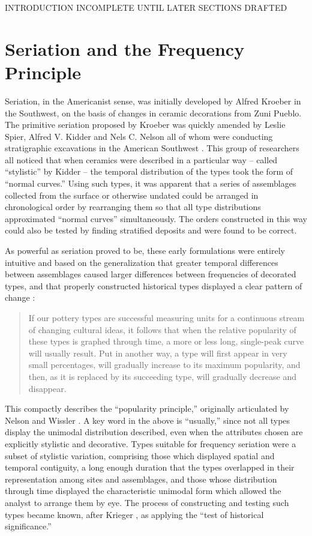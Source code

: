 \documentclass[graybox,natbib]{svmult}
\begin{document}
INTRODUCTION INCOMPLETE UNTIL LATER SECTIONS DRAFTED

\section{Seriation and the Frequency
Principle}\label{seriation-and-the-frequency-principle}

Seriation, in the Americanist sense, was initially developed by Alfred
Kroeber \citep{Kroeber1916} in the Southwest, on the basis of changes in
ceramic decorations from Zuni Pueblo. The primitive seriation proposed
by Kroeber was quickly amended by Leslie Spier, Alfred V. Kidder and
Nels C. Nelson all of whom were conducting stratigraphic excavations in
the American Southwest \citep{Kidder1917, Nelson1916, Spier1917}. This
group of researchers all noticed that when ceramics were described in a
particular way -- called ``stylistic'' by Kidder
\citeyearpar{Kidder1917} -- the temporal distribution of the types took
the form of ``normal curves.'' Using such types, it was apparent that a
series of assemblages collected from the surface or otherwise undated
could be arranged in chronological order by rearranging them so that all
type distributions approximated ``normal curves'' simultaneously. The
orders constructed in this way could also be tested by finding
stratified deposits and were found to be correct.

As powerful as seriation proved to be, these early formulations were
entirely intuitive and based on the generalization that greater temporal
differences between assemblages caused larger differences between
frequencies of decorated types, and that properly constructed historical
types displayed a clear pattern of change \citep[p.~220]{Phillips1951}:

\begin{quote}
If our pottery types are successful measuring units for a continuous
stream of changing cultural ideas, it follows that when the relative
popularity of these types is graphed through time, a more or less long,
single-peak curve will usually result. Put in another way, a type will
first appear in very small percentages, will gradually increase to its
maximum popularity, and then, as it is replaced by its succeeding type,
will gradually decrease and disappear.
\end{quote}

This compactly describes the ``popularity principle,'' originally
articulated by Nelson \citeyearpar{Nelson1916} and Wissler
\citeyearpar{wissler1916application}. A key word in the above is
``usually,'' since not all types display the unimodal distribution
described, even when the attributes chosen are explicitly stylistic and
decorative. Types suitable for frequency seriation were a subset of
stylistic variation, comprising those which displayed spatial and
temporal contiguity, a long enough duration that the types overlapped in
their representation among sites and assemblages, and those whose
distribution through time displayed the characteristic unimodal form
which allowed the analyst to arrange them by eye. The process of
constructing and testing such types became known, after Krieger
\citeyearpar{Krieger1944}, as applying the ``test of historical
significance.''
\end{document}
